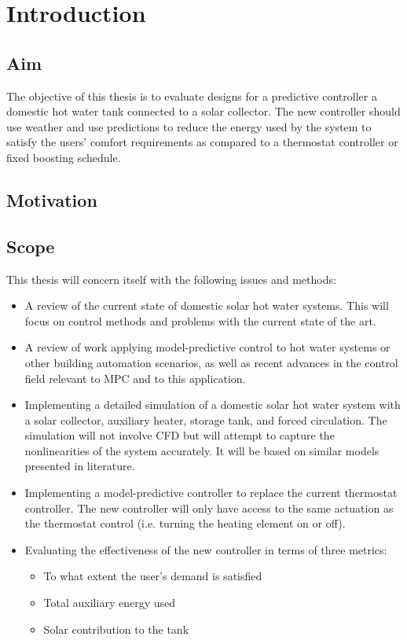 \chapter{Introduction}

\section{Aim}

The objective of this thesis is to evaluate designs for a predictive controller a domestic hot water tank connected to a solar collector.
The new controller should use weather and use predictions to reduce the energy used by the system to satisfy the users' comfort requirements as compared to a thermostat controller or fixed boosting schedule.


\section{Motivation}

\section{Scope}

This thesis will concern itself with the following issues and methods:

\begin{itemize}
   \item A review of the current state of domestic solar hot water systems.
         This will focus on control methods and problems with the current state of the art.
   \item A review of work applying model-predictive control to hot water systems or other building automation scenarios, as well as recent advances in the control field relevant to MPC and to this application.
   \item Implementing a detailed simulation of a domestic solar hot water system with a solar collector, auxiliary heater, storage tank, and forced circulation.
         The simulation will not involve CFD but will attempt to capture the nonlinearities of the system accurately.
         It will be based on similar models presented in literature.
   \item Implementing a model-predictive controller to replace the current thermostat controller.
         The new controller will only have access to the same actuation as the thermostat control (i.e. turning the heating element on or off).
   \item Evaluating the effectiveness of the new controller in terms of three metrics:
         \begin{itemize}
            \item To what extent the user's demand is satisfied
            \item Total auxiliary energy used
            \item Solar contribution to the tank
         \end{itemize}
\end{itemize}

